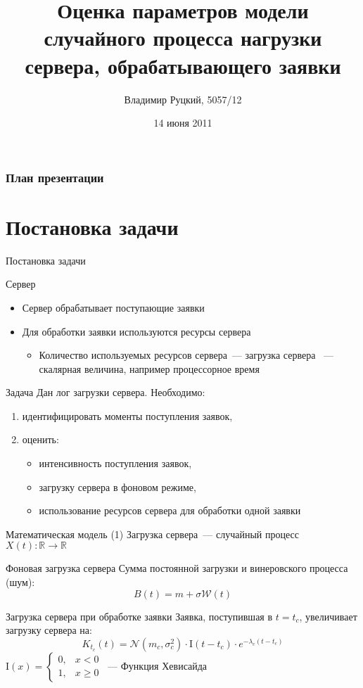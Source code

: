 \documentclass[utf8]{beamer}
\title[Оценка параметров случайного процесса]{Оценка параметров модели случайного процесса нагрузки сервера, обрабатывающего заявки}
\author{Владимир Руцкий, 5057/12}
\institute[СПбГПУ]{Санкт-Петербургский государственный политехнический университет}
\date{14 июня 2011}
\begin{document}
\begin{frame}
\titlepage
\end{frame}


\begin{frame}
\frametitle{План презентации}
\tableofcontents
\end{frame}


\section{Постановка задачи}
\begin{frame}{Постановка задачи}
\begin{block}{Сервер}
  \begin{itemize}
    \item Сервер обрабатывает поступающие заявки
    \item Для обработки заявки используются ресурсы сервера
      \begin{itemize}
        \item Количество используемых ресурсов сервера~--- загрузка сервера ~--- скалярная величина, например процессорное время
      \end{itemize}
  \end{itemize}
\end{block}

\begin{block}{Задача}
  Дан лог загрузки сервера. 
  Необходимо:
  \begin{enumerate}
    \item идентифицировать моменты поступления заявок,
    \item оценить:
      \begin{itemize}
        \item интенсивность поступления заявок,
        \item загрузку сервера в фоновом режиме,
        \item использование ресурсов сервера для обработки одной заявки
      \end{itemize}
  \end{enumerate}
\end{block}
\end{frame}


\begin{frame}{Математическая модель (1)}
Загрузка сервера~--- случайный процесс $X(t)\colon \mathbb{R} \rightarrow \mathbb{R}$
\begin{block}{Фоновая загрузка сервера}
  Сумма постоянной загрузки и винеровского процесса (шум): 
  $$B(t) = m + \sigma \mathcal{W}(t)$$
\end{block}
\begin{block}{Загрузка сервера при обработке заявки}
  Заявка, поступившая в $t=t_c$, увеличивает загрузку сервера на:
  $$K_{t_c}(t) = \mathcal{N}(m_c, \sigma_c^2) \cdot \mathrm{I}(t - t_c) \cdot 
    e^{-\lambda_c(t - t_c)}$$
  {\footnotesize $\mathrm{I}(x) = \left\{
    \begin{array}{rl}
      0, & x < 0 \\
      1, & x \geqslant 0
    \end{array}\right.$~--- Функция Хевисайда}
\end{block}
\end{frame}
\end{document}
